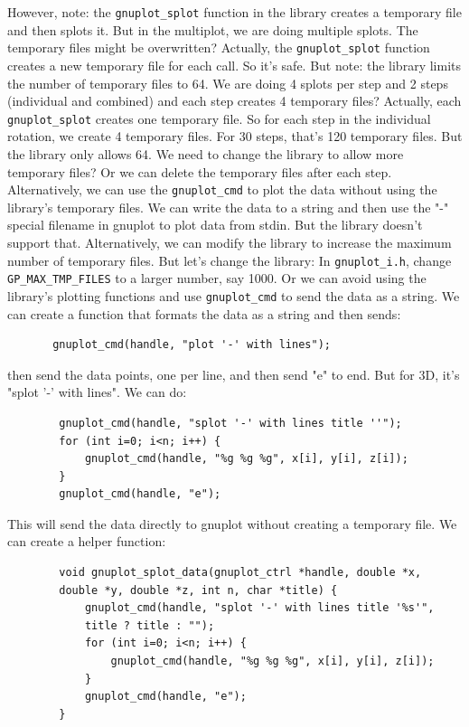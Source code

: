 \documentclass[a4paper,10pt]{article}
\begin{document}
However, note: the \verb|gnuplot_splot| function in the library creates a temporary file and then splots it. But in the multiplot, we are doing multiple splots. The temporary files might be overwritten?
Actually, the \verb|gnuplot_splot| function creates a new temporary file for each call. So it's safe.
But note: the library limits the number of temporary files to 64. We are doing 4 splots per step and 2 steps (individual and combined) and each step creates 4 temporary files? Actually, each \verb|gnuplot_splot| creates one temporary file. So for each step in the individual rotation, we create 4 temporary files. For 30 steps, that's 120 temporary files. But the library only allows 64.
We need to change the library to allow more temporary files? Or we can delete the temporary files after each step.
Alternatively, we can use the \verb|gnuplot_cmd| to plot the data without using the library's temporary files.
We can write the data to a string and then use the "-" special filename in gnuplot to plot data from stdin.
But the library doesn't support that.
Alternatively, we can modify the library to increase the maximum number of temporary files.
But let's change the library:
In \verb|gnuplot_i.h|, change \verb|GP_MAX_TMP_FILES| to a larger number, say 1000.
Or we can avoid using the library's plotting functions and use \verb|gnuplot_cmd| to send the data as a string.
We can create a function that formats the data as a string and then sends:
\begin{verbatim}
       gnuplot_cmd(handle, "plot '-' with lines");
\end{verbatim}
then send the data points, one per line, and then send "e" to end.
But for 3D, it's "splot '-' with lines".
   We can do:
\begin{verbatim}
        gnuplot_cmd(handle, "splot '-' with lines title ''");
        for (int i=0; i<n; i++) {
            gnuplot_cmd(handle, "%g %g %g", x[i], y[i], z[i]);
        }
        gnuplot_cmd(handle, "e");
\end{verbatim}
This will send the data directly to gnuplot without creating a temporary file.
We can create a helper function:
\begin{verbatim}
        void gnuplot_splot_data(gnuplot_ctrl *handle, double *x,
        double *y, double *z, int n, char *title) {
            gnuplot_cmd(handle, "splot '-' with lines title '%s'",
            title ? title : "");
            for (int i=0; i<n; i++) {
                gnuplot_cmd(handle, "%g %g %g", x[i], y[i], z[i]);
            }
            gnuplot_cmd(handle, "e");
        }
\end{verbatim}
\end{document}
